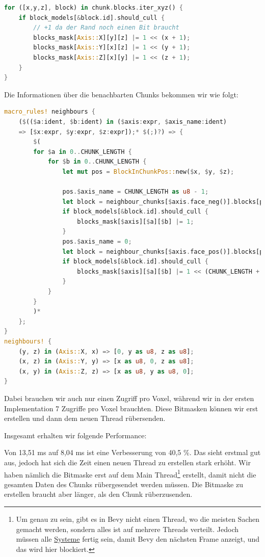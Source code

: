 \begin{lstlisting}[language=Rust]
for ([x,y,z], block) in chunk.blocks.iter_xyz() {
	if block_models[&block.id].should_cull {
		// +1 da der Rand noch einen Bit braucht
		blocks_mask[Axis::X][y][z] |= 1 << (x + 1);
		blocks_mask[Axis::Y][x][z] |= 1 << (y + 1);
		blocks_mask[Axis::Z][x][y] |= 1 << (z + 1);
	}
}
\end{lstlisting}

Die Informationen über die benachbarten Chunks
bekommen wir wie folgt:

\begin{lstlisting}[language=Rust]
macro_rules! neighbours {
	($(($a:ident, $b:ident) in ($axis:expr, $axis_name:ident)
	=> [$x:expr, $y:expr, $z:expr]);* $(;)?) => {
		$(
		for $a in 0..CHUNK_LENGTH {
			for $b in 0..CHUNK_LENGTH {
				let mut pos = BlockInChunkPos::new($x, $y, $z);

				pos.$axis_name = CHUNK_LENGTH as u8 - 1;
				let block = neighbour_chunks[$axis.face_neg()].blocks[pos];
				if block_models[&block.id].should_cull {
					blocks_mask[$axis][$a][$b] |= 1;
				}
				pos.$axis_name = 0;
				let block = neighbour_chunks[$axis.face_pos()].blocks[pos];
				if block_models[&block.id].should_cull {
					blocks_mask[$axis][$a][$b] |= 1 << (CHUNK_LENGTH + 1);
				}
			}
		}
		)*
	};
}
neighbours! {
	(y, z) in (Axis::X, x) => [0, y as u8, z as u8];
	(x, z) in (Axis::Y, y) => [x as u8, 0, z as u8];
	(x, y) in (Axis::Z, z) => [x as u8, y as u8, 0];
}
\end{lstlisting}

Dabei brauchen wir auch nur einen Zugriff pro Voxel,
während wir in der ersten Implementation 7 Zugriffe
pro Voxel brauchten.
Diese Bitmasken können wir erst erstellen und
dann dem neuen Thread rübersenden.

Insgesamt erhalten wir folgende Performance:

\vspace{0.3cm}


\vspace{0.3cm}

Von 13,51 ms auf 8,04 ms ist eine Verbesserung
von 40,5 \%. Das sieht erstmal gut aus,
jedoch hat sich die Zeit einen neuen Thread zu
erstellen stark erhöht. Wir haben nämlich die Bitmaske
erst auf dem Main Thread\footnote{
	Um genau zu sein, gibt es in Bevy
	nicht einen  Thread, wo die meisten Sachen
	gemacht werden, sondern alles ist auf mehrere Threads
	verteilt. Jedoch müssen alle
	\href{https://bevy-cheatbook.github.io/programming/systems.html}{Systeme}
	\cite{bevy_systems} fertig sein, damit Bevy den
	nächsten Frame anzeigt, und das wird hier blockiert.
}
erstellt, damit nicht die
gesamten Daten des Chunks rübergesendet werden müssen.
Die Bitmaske zu erstellen braucht aber länger,
als den Chunk rüberzusenden.

